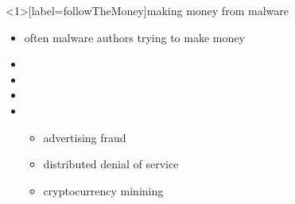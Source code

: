 \begin{frame}<1>[label=followTheMoney]{making money from malware}
    \begin{itemize}
    \item often malware authors trying to make money
    \vspace{.5cm}
    \item {}
    \item {}
    \item {}
    \item {}
        \begin{itemize}
        \item advertising fraud
        \item distributed denial of service
        \item cryptocurrency minining
        \end{itemize}
    \end{itemize}
\end{frame}
